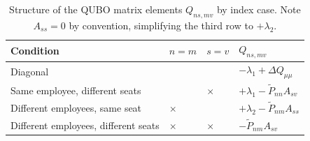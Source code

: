 \documentclass[10pt]{article}
\theoremstyle{definition}
\theoremstyle{plain}
\theoremstyle{remark}
\begin{document}
	\begin{table}[h!]
		\centering
		\begin{tabular}{llll}
			\hline
			Condition & $n=m$ & $s=v$ & $Q_{ns,mv}$ \\
			\hline
			Diagonal & \checkmark & \checkmark & $-\lambda_1 + \Delta Q_{\mu\mu}$ \\
			Same employee, different seats & \checkmark & $\times$ & $+\lambda_1 - \tilde{P}_{nn}A_{sv}$ \\
			Different employees, same seat & $\times$ & \checkmark & $+\lambda_2 - \tilde{P}_{nm}A_{ss}$ \\
			Different employees, different seats & $\times$ & $\times$ & $-\tilde{P}_{nm}A_{sv}$ \\
			\hline
		\end{tabular}
		\caption{Structure of the QUBO matrix elements $Q_{ns,mv}$ by index case. 
			Note $A_{ss}=0$ by convention, simplifying the third row to $+\lambda_2$.}
		\label{tab:qubo_elements}
	\end{table}
	
\end{document}
